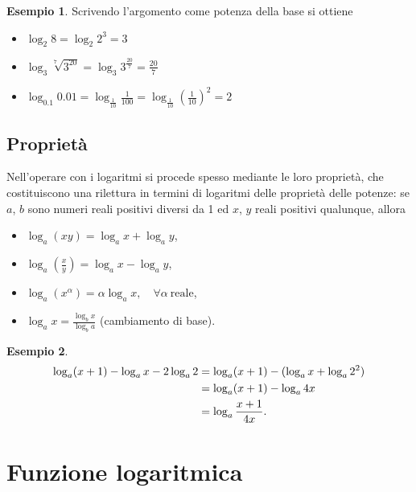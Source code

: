 \documentclass[
  11pt,
]{krantz}
\providecommand{\tightlist}{%
  \setlength{\itemsep}{0pt}\setlength{\parskip}{0pt}}
\theoremstyle{definition}
\theoremstyle{definition}
\newtheorem{example}{Esempio}[chapter]
\theoremstyle{definition}
\theoremstyle{definition}
\theoremstyle{remark}
\begin{document}
\begin{example}

Scrivendo l'argomento come potenza della base si ottiene

\begin{itemize}
\tightlist
\item
  \(\log_2 8 = \log_2 2^3 = 3\)
\item
  \(\log_3 \sqrt[7]{3^{20}} = \log_3 3^{\frac{20}{7}} = \frac{20}{7}\)
\item
  \(\log_{0.1} 0.01 = \log_{\frac{1}{10}}\frac{1}{100} = \log_{\frac{1}{10}}\left(\frac{1}{10}\right)^2 = 2\)
\end{itemize}

\end{example}

\hypertarget{proprietuxe0-2}{%
\subsection*{Proprietà}\label{proprietuxe0-2}}


Nell'operare con i logaritmi si procede spesso mediante le loro proprietà, che costituiscono una rilettura in termini di logaritmi delle proprietà delle potenze: se \(a\), \(b\) sono numeri reali positivi diversi da 1 ed \(x\), \(y\) reali positivi qualunque, allora

\begin{itemize}
\tightlist
\item
  \(\log_a (xy) = \log_a x + \log_a y\),
\item
  \(\log_a \left(\frac{x}{y}\right) = \log_a x - \log_a y\),
\item
  \(\log_a \left(x^{\alpha}\right) = \alpha \log_a x, \quad \forall \alpha \ \text{reale}\),
\item
  \(\log_a x = \frac{\log_b x}{\log_b a}\) (cambiamento di base).
\end{itemize}

\begin{example}
\begin{align}
\log_a (x+1) -\log_a x - 2 \log_a 2 &= \log_a (x+1) - (\log_a x+ \log_a 2^2)\notag\\
&= \log_a (x+1) - \log_a 4x\notag\\
&= \log_a \frac{x+1}{4x}.\notag
\end{align}
\end{example}

\hypertarget{funzione-logaritmica}{%
\section{Funzione logaritmica}\label{funzione-logaritmica}}
\end{document}
